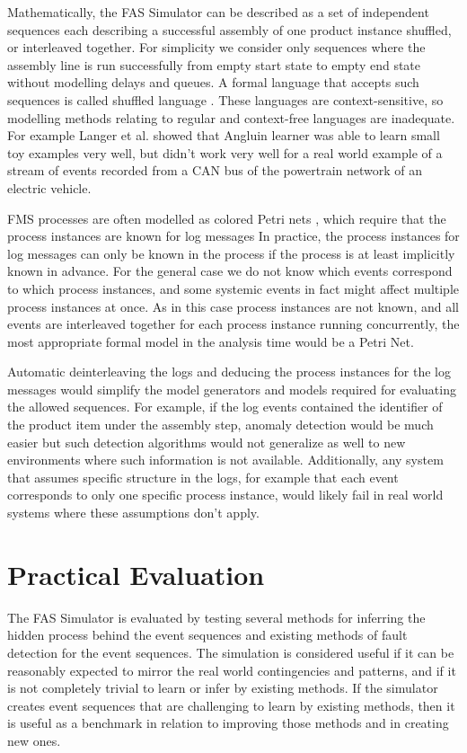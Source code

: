 \documentclass[journal]{IEEEtran}
\begin{document}
Mathematically, the FAS Simulator can be described as a set of independent sequences each describing a successful assembly of one product instance shuffled, or interleaved
together.
For simplicity we consider only sequences where the assembly line is run successfully from empty start state to empty end state without modelling delays and queues.
A formal language that accepts such sequences is called shuffled language \cite{berglund2011recognizing}. These languages are context-sensitive, so modelling methods
relating to regular and context-free languages are inadequate. For example Langer et al. \cite{langer2011self} showed that Angluin learner was able to learn small
toy examples very well, but didn't work very well for a real world example of a stream of events recorded from a CAN bus of the powertrain network of an electric vehicle.

FMS processes are often modelled as colored Petri nets \cite{saitou2002robust}, which require that the process instances are known for log messages
In practice, the process instances for log messages can only be known in the process
if the process is at least implicitly known in advance. For the general case we do not know which events correspond to which process instances, and some systemic events
in fact might affect multiple process instances at once. As in this
case process instances are not known, and all events are interleaved together for each process instance running concurrently, the most appropriate formal
model in the analysis time would be a Petri Net.

Automatic deinterleaving the logs and deducing the process instances for the log messages would simplify the model generators and models required
for evaluating the allowed sequences.
For example, if the log events contained the identifier of the product
item under the assembly step, anomaly detection would be much easier but such detection algorithms would not generalize as well
to new environments where such information is not available. Additionally, any system that assumes specific structure in the logs, for example that each event corresponds to
only one specific process instance, would likely fail in real world systems where these assumptions don't apply.

\section{Practical Evaluation}

The FAS Simulator is evaluated by testing several methods for inferring the hidden process behind the event sequences and existing methods of fault detection for
the event sequences.
The simulation is considered useful if it can be reasonably expected to mirror the real world contingencies and patterns, and if it is not completely trivial to
learn or infer by existing methods. If the simulator creates event sequences that are challenging to learn by existing methods, then it is useful as a benchmark
in relation to improving those methods and in creating new ones.
\end{document}
